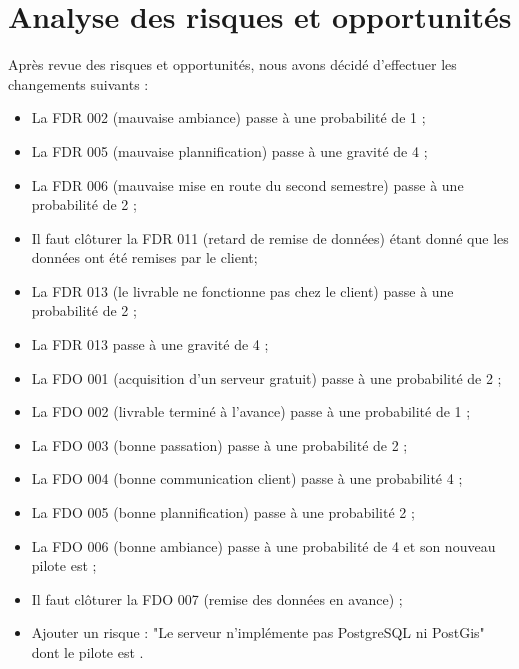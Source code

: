 \documentclass [a4paper] {article}
\begin{document}
\section{Analyse des risques et opportunités}
Après revue des risques et opportunités, nous avons décidé d'effectuer les changements suivants :
\begin{itemize}
\item La FDR 002 (mauvaise ambiance) passe à une probabilité de 1 ;
\item La FDR 005 (mauvaise plannification) passe à une gravité de 4 ;
\item La FDR 006 (mauvaise mise en route du second semestre) passe à une probabilité de 2 ;
\item Il faut clôturer la FDR 011 (retard de remise de données) étant donné que les données ont été remises par le client;
\item La FDR 013 (le livrable ne fonctionne pas chez le client) passe à une probabilité de 2 ;
\item La FDR 013 passe à une gravité de 4 ;
\item La FDO 001 (acquisition d'un serveur gratuit) passe à une probabilité de 2 ;
\item La FDO 002 (livrable terminé à l'avance) passe à une probabilité de 1 ;
\item La FDO 003 (bonne passation) passe à une probabilité de 2 ;
\item La FDO 004 (bonne communication client) passe à une probabilité 4 ;
\item La FDO 005 (bonne plannification) passe à une probabilité 2 ;
\item La FDO 006 (bonne ambiance) passe à une probabilité de 4 et son nouveau pilote est \Michel ;
\item Il faut clôturer la FDO 007 (remise des données en avance) ;
\item Ajouter un risque : "Le serveur n'implémente pas PostgreSQL ni PostGis" dont le pilote est \Sergi.
\end{itemize}




\end{document}
